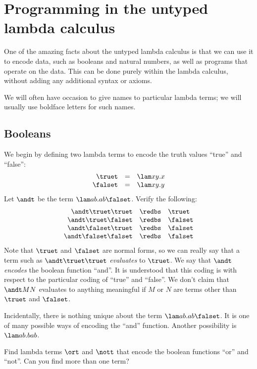 \documentclass[12pt]{article}
\begin{document}
\section{Programming in the untyped lambda calculus}

One of the amazing facts about the untyped lambda calculus is that we
can use it to encode data, such as booleans and natural numbers, as well as
programs that operate on the data. This can be done purely within the
lambda calculus, without adding any additional syntax or axioms.

We will often have occasion to give names to particular lambda terms;
we will usually use boldface letters for such names.

\subsection{Booleans}\label{ssec-booleans}

We begin by defining two lambda terms to encode the truth values
``true'' and ``false'':
\[ \begin{array}{rcl}
  \truet &=& \lam xy.x \\
  \falset &=& \lam xy.y
\end{array}
\]
Let $\andt$ be the term $\lam ab.ab\falset$. Verify the following:
\[ \begin{array}{rcl}
  \andt \truet \truet &\redbs& \truet \\
  \andt \truet \falset &\redbs& \falset \\
  \andt \falset \truet &\redbs& \falset \\
  \andt \falset \falset &\redbs& \falset
\end{array}
\]
Note that $\truet$ and $\falset$ are normal forms, so we can really
say that a term such as $\andt \truet \truet$ {\em evaluates} to
$\truet$. We say that $\andt$ {\em encodes} the boolean function
``and''. It is understood that this coding is with respect to the
particular coding of ``true'' and ``false''. We don't claim that
$\andt MN$ evaluates to anything meaningful if $M$ or $N$ are terms
other than $\truet$ and $\falset$.

Incidentally, there is nothing unique about the term $\lam
ab.ab\falset$. It is one of many possible ways of encoding the ``and''
function. Another possibility is $\lam ab.bab$.

\begin{exercise}
  Find lambda terms $\ort$ and $\nott$ that encode the boolean
  functions ``or'' and ``not''. Can you find more than one term?
\end{exercise}
\end{document}
